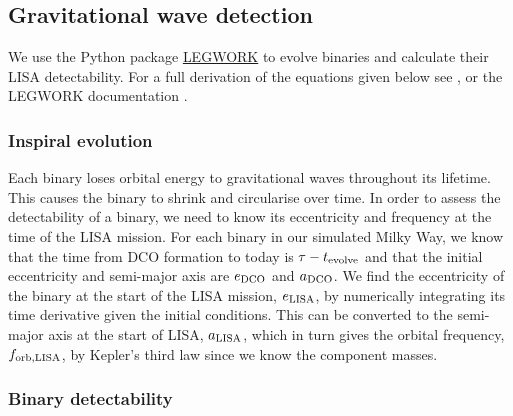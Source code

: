 \subsection{Gravitational wave detection}\label{sec:gw_detection}
We use the Python package \href{https://legwork.readthedocs.io/en/latest/}{LEGWORK} \citep{Wagg+2021} to evolve binaries and calculate their LISA detectability. For a full derivation of the equations given below see \citep[][Section~3]{Wagg+2021}, or the LEGWORK documentation \href{https://legwork.readthedocs.io/en/latest/notebooks/Derivations.html}{\faBook}.

\subsubsection{Inspiral evolution}

Each binary loses orbital energy to gravitational waves throughout its lifetime. This causes the binary to shrink and circularise over time. In order to assess the detectability of a binary, we need to know its eccentricity and frequency at the time of the LISA mission. For each binary in our simulated Milky Way, we know that the time from DCO formation to today is $\tau - t_{\rm evolve}$ and that the initial eccentricity and semi-major axis are $e_{\rm DCO}$ and $a_{\rm DCO}$. We find the eccentricity of the binary at the start of the LISA mission, $e_{\rm LISA}$, by numerically integrating its time derivative \citep[][Eq. 5.13]{Peters+1964} given the initial conditions. This can be converted to the semi-major axis at the start of LISA, $a_{\rm LISA} $\citep[][Eq. 5.11]{Peters+1964}, which in turn gives the orbital frequency, $f_{\rm orb, LISA}$, by Kepler's third law since we know the component masses.

\subsubsection{Binary detectability}

